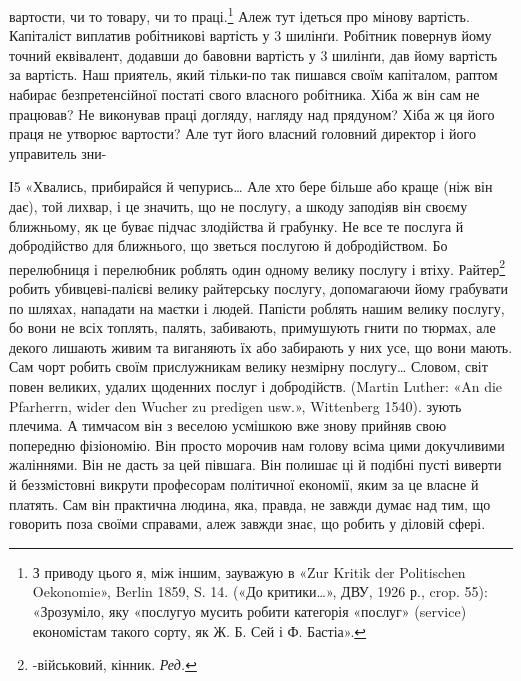 вартости, чи то товару, чи то праці.\footnote{
З приводу цього я, між іншим, зауважую в «Zur Kritik der Politischen
Oekonomie», Berlin 1859, S. 14. («До критики\dots{}», ДВУ, 1926 р.,
crop. 55): «Зрозуміло, яку «послугуо мусить робити категорія «послуг»
(service) економістам такого сорту, як Ж. Б. Сей і Ф. Бастіа».
} Алеж тут ідеться
про мінову вартість. Капіталіст виплатив робітникові вартість
у 3 шилінґи. Робітник повернув йому точний еквівалент, додавши
до бавовни вартість у 3 шилінґи, дав йому вартість за вартість.
Наш приятель, який тільки-по так пишався своїм капіталом,
раптом набирає безпретенсійної постаті свого власного робітника.
Хіба ж він сам не працював? Не виконував праці догляду, нагляду
над прядуном? Хіба ж ця його праця не утворює вартости?
Але тут його власний головний директор і його управитель зни-

І5 «Хвались, прибирайся й чепурись\dots{} Але хто бере більше або краще
(ніж він дає), той лихвар, і це значить, що не послугу, а шкоду заподіяв
він своєму ближньому, як це буває підчас злодійства й грабунку. Не все
те послуга й добродійство для ближнього, що зветься послугою й добродійством.
Бо перелюбниця і перелюбник роблять один одному велику
послугу і втіху. Райтер\footnote*{
-військовий, кінник. \emph{Ред.}
} робить убивцеві-палієві велику райтерську
послугу, допомагаючи йому грабувати по шляхах, нападати на маєтки і
людей. Папісти роблять нашим велику послугу, бо вони не всіх топлять,
палять, забивають, примушують гнити по тюрмах, але декого лишають
живим та виганяють їх або забирають у них усе, що вони мають. Сам чорт
робить своїм прислужникам велику незмірну послугу\dots{} Словом, світ
повен великих, удалих щоденних послуг і добродійств. (Martin Luther:
«An die Pfarherrn, wider den Wucher zu predigen usw.», Wittenberg 1540).
зують плечима. А тимчасом він з веселою усмішкою вже знову прийняв
свою попередню фізіономію. Він просто морочив нам голову
всіма цими докучливими жаліннями. Він не дасть за цей півшага.
Він полишає ці й подібні пусті виверти й беззмістовні викрути
професорам політичної економії, яким за це власне й платять.
Сам він практична людина, яка, правда, не завжди думає над тим,
що говорить поза своїми справами, алеж завжди знає, що робить
у діловій сфері.

